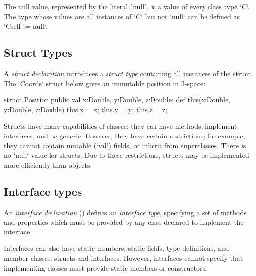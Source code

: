 



The null value, represented by the literal
\xcd"null", is a value of every class type \xcd`C`. The type whose values are
all instances of \xcd`C` but not 
\xcd`null` can be defined as \xcd`C{self != null}`.

\subsection{Struct Types}

A {\em struct declaration}  introduces a {\em struct type}
containing all instances of the struct.  The \xcd`Coords` struct below gives
an immutable position in 3-space: 
\begin{xten}
struct Position {
  public val x:Double, y:Double, z:Double; 
  def this(x:Double, y:Double, z:Double) {
     this.x = x; this.y = y; this.z = z;
  }
}
\end{xten}
%

Structs have many capabilities of classes: they can have methods, implement
interfaces, and be generic. However, they have certain restrictions; for
example, they cannot contain mutable (\xcd`val`) fields, or inherit from
superclasses. There is no \xcd`null` value for structs. Due to these
restrictions, structs may be implemented more efficiently than objects.


\subsection{Interface types}
\label{InterfaceTypes}


An {\em interface declaration} () defines an {\em
interface type}, specifying a set of methods 
and properties which must be provided by any class declared to implement the
interface. 


Interfaces can also have static members: static fields, type
definitions, and member classes, structs and interfaces.  However,
interfaces cannot specify that implementing classes must provide
static members or constructors.


